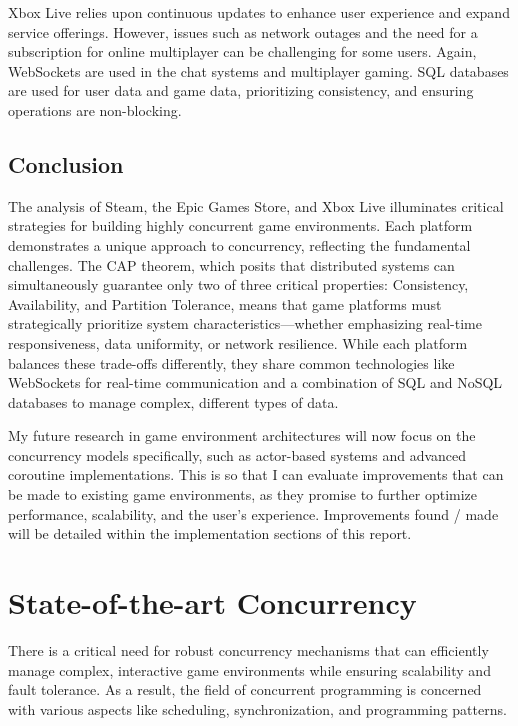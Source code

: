 \documentclass[]{final}
\begin{document}
Xbox Live relies upon continuous updates to enhance user experience and
expand service offerings. However, issues such as network outages and the need
for a subscription for online multiplayer can be challenging for some users.
Again, WebSockets are used in the chat systems and multiplayer gaming.
SQL databases are used for user data and game data,\cite{woolsey_how_2024}
prioritizing consistency, and ensuring operations are non-blocking.


\section{Conclusion}

The analysis of Steam, the Epic Games Store, and Xbox Live illuminates
critical strategies for building highly concurrent game environments. Each platform
demonstrates a unique approach to concurrency, reflecting the fundamental challenges.
The CAP theorem, which posits that distributed systems can
simultaneously guarantee only two of three critical properties: Consistency,
Availability, and Partition Tolerance, means that game platforms must
strategically prioritize system characteristics—whether emphasizing real-time
responsiveness, data uniformity, or network resilience.
\cite{gilbert_perspectives_2012} While each platform balances these
trade-offs differently, they share common technologies like WebSockets for real-time
communication and a combination of SQL and NoSQL databases to manage complex,
different types of data.

My future research in game environment architectures will now focus
on the concurrency models specifically, such as actor-based systems and advanced coroutine
implementations. This is so that I can evaluate improvements that can be made to
existing game environments, as they promise to further optimize performance, scalability,
and the user's experience. Improvements found / made will be detailed within
the implementation sections of this report.

\chapter{State-of-the-art Concurrency}

There is a critical need for robust concurrency mechanisms that can efficiently
manage complex, interactive game environments while ensuring scalability
and fault tolerance. As a result, the field of concurrent programming is concerned
with various aspects like scheduling, synchronization, and programming patterns.
\end{document}
